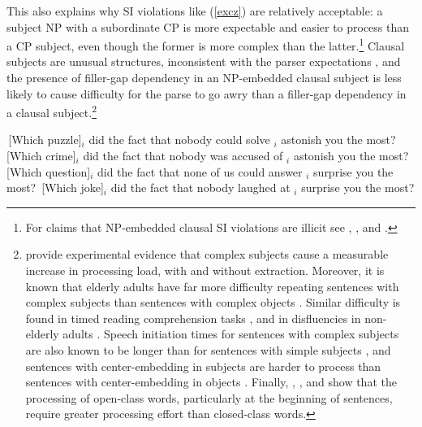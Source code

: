 \documentclass[output=paper
 	        ,biblatex
                ,babelshorthands
                ,newtxmath
                ,draftmode
                ,colorlinks, citecolor=brown
]{langscibook}
\begin{document}
This also explains why SI violations like  (\ref{excz}) are relatively acceptable: a subject NP with a subordinate CP  
is more expectable and easier to process than a CP subject, even though the former is more complex than the latter.\footnote{For claims that NP-embedded clausal SI violations are illicit see  \citet[42]{lasniksaito},   \citet[796]{colinphillips}, and    \citet[67]{colin_horn}.}  Clausal subjects are unusual structures, inconsistent with the parser expectations \citep{fod74},  and   the presence of filler-gap dependency in an  NP-embedded clausal subject is less likely
to cause  difficulty for the parse to go awry than a  filler-gap dependency in a clausal subject.\footnote{\citet{clausen,clausencuny} provide  experimental evidence that  complex subjects cause  a measurable increase in processing load,  with and without extraction. Moreover,  it is known that 
elderly adults  have far more difficulty repeating sentences with complex subjects than sentences with complex objects  \citep{kemper86}. Similar difficulty is  found in timed reading comprehension tasks  \citep{kynette}, and in   disfluencies in non-elderly adults \citep{clarkwasow}. 
Speech initiation times  for sentences with complex subjects are
also known to be longer than for sentences with 
 simple subjects  \citep{ferreirasubj,tsiam},
 and sentences with center-embedding in subjects 
are harder to process than sentences 
with center-embedding in objects \citep{amy,eady}.
Finally,  \citet{garnsey}, \citet{kutasetal}, and \citet{vanpetten}  show
that the processing of open-class words, particularly at
the beginning of sentences, require
greater processing effort than closed-class words.}


\eal \label{excz}
\ex  \,[Which puzzle]$_i$ did the fact that nobody could solve \spc$_i$ astonish you the most?
\ex \,[Which crime]$_i$ did the fact that nobody was accused of \spc$_i$ astonish you the most?
\ex \,[Which question]$_i$ did the fact that none of us could answer \spc$_i$  surprise you the most?
\ex \,[Which joke]$_i$ did the fact that nobody laughed at \spc$_i$ surprise you the most?
\zl
\end{document}
